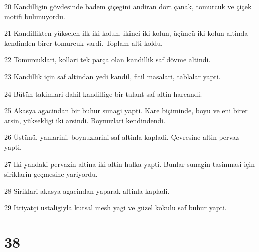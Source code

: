 \par 20 Kandilligin gövdesinde badem çiçegini andiran dört çanak, tomurcuk ve çiçek motifi bulunuyordu.
\par 21 Kandillikten yükselen ilk iki kolun, ikinci iki kolun, üçüncü iki kolun altinda kendinden birer tomurcuk vardi. Toplam alti koldu.
\par 22 Tomurcuklari, kollari tek parça olan kandillik saf dövme altindi.
\par 23 Kandillik için saf altindan yedi kandil, fitil masalari, tablalar yapti.
\par 24 Bütün takimlari dahil kandillige bir talant saf altin harcandi.
\par 25 Akasya agacindan bir buhur sunagi yapti. Kare biçiminde, boyu ve eni birer arsin, yüksekligi iki arsindi. Boynuzlari kendindendi.
\par 26 Üstünü, yanlarini, boynuzlarini saf altinla kapladi. Çevresine altin pervaz yapti.
\par 27 Iki yandaki pervazin altina iki altin halka yapti. Bunlar sunagin tasinmasi için siriklarin geçmesine yariyordu.
\par 28 Siriklari akasya agacindan yaparak altinla kapladi.
\par 29 Itriyatçi ustaligiyla kutsal mesh yagi ve güzel kokulu saf buhur yapti.

\chapter{38}

